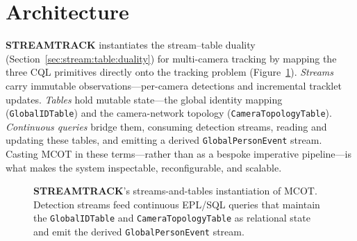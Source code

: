 \documentclass[review]{elsarticle}
\begin{document}
\section{Architecture}\label{sec:overview}

\textbf{STREAMTRACK} instantiates the stream--table duality
(Section~\ref{sec:stream:table:duality}) for multi-camera tracking by mapping the three CQL primitives directly onto the tracking problem (Figure~\ref{fig:duality}). \emph{Streams} carry immutable observations---per-camera detections and incremental tracklet updates. \emph{Tables} hold mutable state---the global identity mapping (\texttt{GlobalIDTable}) and the camera-network topology  (\texttt{CameraTopologyTable}). \emph{Continuous queries} bridge them, consuming detection streams, reading and updating these tables, and emitting a derived \texttt{GlobalPersonEvent} stream. Casting MCOT in these terms---rather than as a bespoke imperative pipeline---is what makes the system inspectable, reconfigurable, and scalable.

\begin{figure}[tbh!]
\centering
{}
\caption{\textbf{STREAMTRACK}'s streams-and-tables instantiation of MCOT. Detection streams
feed continuous EPL/SQL queries that maintain the \texttt{GlobalIDTable} and
\texttt{CameraTopologyTable} as relational state and emit the derived
\texttt{GlobalPersonEvent} stream.}
\label{fig:duality}
\end{figure}
\end{document}

